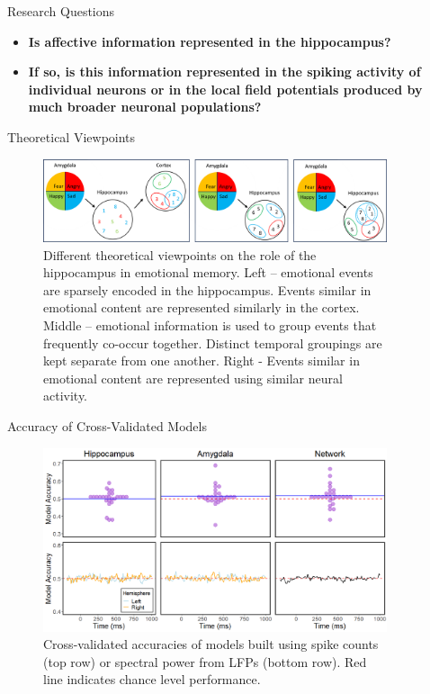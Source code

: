 \documentclass[final,20pt]{beamer}
\newlength{\sepwidth}
\newlength{\colwidth}
\newlength{\colwidthbig}
\newlength{\colwidthsmall}
\newcommand{\separatorcolumn}{\begin{column}{\sepwidth}\end{column}}
\begin{document}
\begin{frame}[t]
\begin{columns}[t]
\begin{column}{\colwidthsmall}
 

\end{column}
\separatorcolumn

\begin{column}{\colwidthbig}
\begin{alertblock}{Research Questions}
    \centering
    \begin{itemize}
    	\item \textbf{Is affective information represented in the hippocampus?}
    	\item \textbf{If so, is this information represented in the spiking activity of individual neurons or in the local field potentials produced by much broader neuronal populations?}
    \end{itemize}
  \end{alertblock}
  \begin{block}{Theoretical Viewpoints}
    \begin{figure}
    \centering
    \includegraphics[width=1\textwidth]{figures/Theories.png}
    \caption{Different theoretical viewpoints on the role of the hippocampus in emotional memory. Left – emotional events are sparsely encoded in the hippocampus. Events similar in emotional content are represented similarly in the cortex. Middle – emotional information is used to group events that frequently co-occur together. Distinct temporal groupings are kept separate from one another. Right - Events similar in emotional content are represented using similar neural activity.}
    \end{figure}
  \end{block}

  \begin{block}{Accuracy of Cross-Validated Models}
    \begin{figure}
    \centering
     \includegraphics[width=1\textwidth]{figures/cns fig.png}
     \hfill
     \caption{Cross-validated accuracies of models built using spike counts (top row) or spectral power from LFPs (bottom row). Red line indicates chance level performance.}
    \end{figure}
  

\end{block}
\end{column}
\end{columns}
\end{frame}
\end{document}
